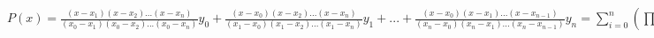 {\normalsize
    
    $P(x) = \frac{(x-x_1)(x-x_2)...(x-x_n)}{(x_0-x_1)(x_0-x_2)...(x_0-x_n)}y_0 + 
    \frac{(x-x_0)(x-x_2)...(x-x_n)}{(x_1-x_0)(x_1-x_2)...(x_1-x_n)}y_1 + ... +
    \frac{(x-x_0)(x-x_1)...(x-x_{n-1})}{(x_n-x_0)(x_n-x_1)...(x_n-x_{n-1})}y_n
    =\sum_{i=0}^{n} (\prod_{j=0, i\neq j}^{n} \frac{x-x_j}{x_i-x_j} )
    $
}
